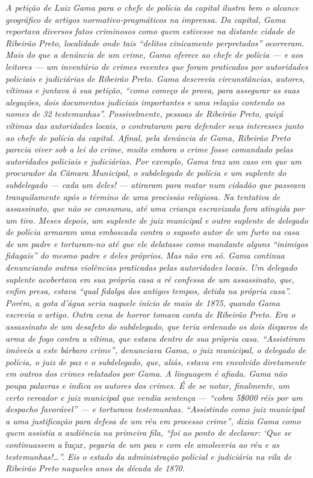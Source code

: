 \begin{didascalia}
\emph{A petição de Luiz Gama para o chefe de polícia da capital ilustra
bem o alcance geográfico de artigos normativo-pragmáticos na imprensa.
Da capital, Gama reportava diversos fatos criminosos como quem estivesse
na distante cidade de Ribeirão Preto, localidade onde tais ``delitos
cinicamente perpretados'' ocorreram. Mais do que a denúncia de um crime,
Gama oferece ao chefe de polícia --- e aos leitores --- um inventário de
crimes recentes que foram praticados por autoridades policiais e
judiciárias de Ribeirão Preto. Gama descrevia circunstâncias, autores,
vítimas e juntava à sua petição, ``como começo de prova, para assegurar
as suas alegações, dois documentos judiciais importantes e uma relação
contendo os nomes de 32 testemunhas''. Possivelmente, pessoas de Ribeirão
Preto, quiçá vítimas das autoridades locais, o contrataram para defender
seus interesses junto ao chefe de polícia da capital. Afinal, pela
denúncia de Gama, Ribeirão Preto parecia viver sob a lei do crime, muito
embora o crime fosse comandado pelas autoridades policiais e
judiciárias. Por exemplo, Gama traz um caso em que um procurador da
Câmara Municipal, o subdelegado de polícia e um suplente do subdelegado
--- cada um deles! --- atiraram para matar num cidadão que passeava
tranquilamente após o término de uma procissão religiosa. Na tentativa
de assassinato, que não se consumou, até uma criança escravizada fora
atingida por um tiro. Meses depois, um suplente de juiz municipal e
outro suplente de delegado de polícia armaram uma emboscada contra o
suposto autor de um furto na casa de um padre e torturam-no até que ele
delatasse como mandante alguns ``inimigos fidagais'' do mesmo padre e
deles próprios. Mas não era só. Gama continua denunciando outras
violências praticadas pelas autoridades locais. Um delegado suplente
acobertava em sua própria casa a ré confessa de um assassinato, que,
enfim presa, estava ``qual fidalga dos antigos tempos, detida na própria
casa''. Porém, a gota d'água seria naquele início de maio de 1875, quando
Gama escrevia o artigo. Outra cena de horror tomava conta de Ribeirão
Preto. Era o assassinato de um desafeto do subdelegado, que teria
ordenado os dois disparos de arma de fogo contra a vítima, que estava
dentro de sua própria casa. ``Assistiram imóveis a este bárbaro crime'',
denunciava Gama, o juiz municipal, o delegado de polícia, o juiz de paz
e o subdelegado, que, aliás, estava em envolvido diretamente em outros
dos crimes relatados por Gama. A linguagem é afiada. Gama não poupa
palavras e indica os autores dos crimes. É de se notar, finalmente, um
certo vereador e juiz municipal que vendia sentença --- ``cobra 5\$000
réis por um despacho favorável'' --- e torturava testemunhas. ``Assistindo
como juiz municipal a uma justificação para defesa de um réu em processo
crime'', dizia Gama como quem assistia a audiência na primeira fila, ``foi
ao ponto de declarar: `Que se continuassem a} fuçar\emph{, pegaria de um
pau e com ele amoleceria ao réu e as testemunhas!\ldots{}''. Eis o estado da
administração policial e judiciária na vila de Ribeirão Preto naqueles
anos da década de 1870.}
\end{didascalia}

